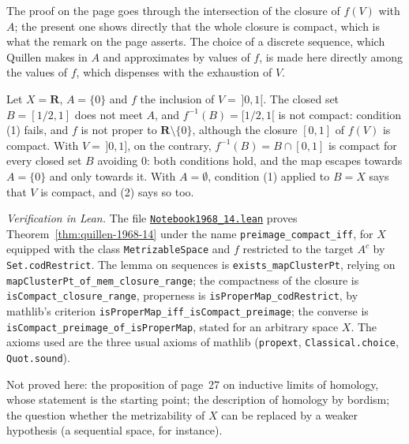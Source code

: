 \noindent The proof on the page goes through the intersection of the closure of $f(V)$ with $A$; the present one shows directly that the whole closure is compact, which is what the remark on the page asserts. The choice of a discrete sequence, which Quillen makes in $A$ and approximates by values of $f$, is made here directly among the values of $f$, which dispenses with the exhaustion of $V$.

\begin{exemple}
Let $X = \mathbf R$, $A = \{0\}$ and $f$ the inclusion of $V = \,]0, 1[$. The closed set $B = [1/2, 1]$ does not meet $A$, and $f^{-1}(B) = [1/2, 1[$ is not compact: condition (1) fails, and $f$ is not proper to $\mathbf R \setminus \{0\}$, although the closure $[0, 1]$ of $f(V)$ is compact. With $V = \,]0, 1]$, on the contrary, $f^{-1}(B) = B \cap [0, 1]$ is compact for every closed set $B$ avoiding $0$: both conditions hold, and the map escapes towards $A = \{0\}$ and only towards it. With $A = \emptyset$, condition (1) applied to $B = X$ says that $V$ is compact, and (2) says so too.
\end{exemple}

\emph{Verification in Lean.} The file \href{\leanblobmain/Notebook1968_14.lean}{\texttt{Notebook1968\_14.\allowbreak{}lean}} proves Theorem~\ref{thm:quillen-1968-14} under the name \texttt{preimage\_compact\_iff}, for $X$ equipped with the class \texttt{MetrizableSpace} and $f$ restricted to the target $A^c$ by \texttt{Set.codRestrict}. The lemma on sequences is \texttt{exists\_mapClusterPt}, relying on \texttt{mapClusterPt\_of\_mem\_closure\_range}; the compactness of the closure is \texttt{isCompact\_closure\_range}, properness is \texttt{isProperMap\_codRestrict}, by mathlib's criterion \texttt{isProperMap\_iff\_isCompact\_preimage}; the converse is \texttt{isCompact\_preimage\_of\_isProperMap}, stated for an arbitrary space $X$. The axioms used are the three usual axioms of mathlib (\texttt{propext}, \texttt{Classical.choice}, \texttt{Quot.sound}).

Not proved here: the proposition of page~27 on inductive limits of homology, whose statement is the starting point; the description of homology by bordism; the question whether the metrizability of $X$ can be replaced by a weaker hypothesis (a sequential space, for instance).


